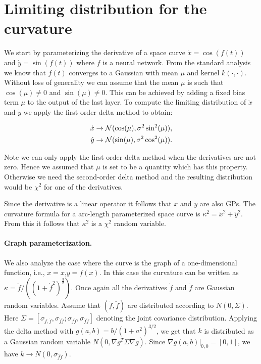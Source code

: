 \section{Limiting distribution for the curvature}

We start by parameterizing the derivative of a space curve $\dot{x} = \cos(f(t))$ 
and $\dot{y} = \sin(f(t))$ where $f$ is a neural network. 
From the standard analysis we know that $f(t)$ converges to a Gaussian with mean $\mu$ and kernel $k(\cdot,\cdot)$. 
Without loss of generality we can assume that the mean $\mu$ is such that $\cos(\mu) \neq 0$ and $\sin(\mu)\neq 0$. 
This can be achieved by adding a fixed bias term $\mu$ to the output of the last layer. 
To compute the limiting distribution of $\ddot{x}$ and $\dot{y}$ we apply the first order delta method to obtain:

\begin{align}
\dot{x} &\rightarrow {\cal N} (\cos(\mu), \sigma^2\sin^2(\mu)), \\
\dot{y} &\rightarrow {\cal N} (\sin(\mu), \sigma^2\cos^2(\mu)). 
\end{align}

Note we can only apply the first order delta method when the derivatives are not zero. 
Hence we assumed that $\mu$ is set to be a quantity which has this property. 
Otherwise we need the second-order delta method and the resulting distribution would be $\chi^2$ for one of the derivatives.

Since the derivative is a linear operator it follows that $\ddot{x}$ and $\ddot{y}$ are also GPs. 
The curvature formula for a arc-length parameterized space curve is $\kappa ^2= \ddot{x}^2 + \ddot{y}^2$. 
From this it follows that $\kappa^2$ is a $\chi^2$ random variable.




\paragraph{Graph parameterization.}

We also analyze the case where the curve is the graph of a one-dimensional function, i.e., $x=x$,$y=f(x)$. 
In this case the curvature can be written as $\kappa=\ddot{f}/((1+\dot{f}^2)^\frac{3}{2})$. 
Once again all the derivatives $\dot{f}$ and $\ddot{f}$ are Gaussian random variables. 
Assume that $(\dot{f}, \ddot{f})$ are distributed according to $N(0,\Sigma)$. Here $\Sigma = [\sigma_{\dot{f},\dot{f}}, \sigma_{\dot{f}\ddot{f}}; \sigma_{\dot{f}\ddot{f}}, \sigma_{\ddot{f}\ddot{f}} ]$ denoting the joint covariance distribution.
Applying the delta method with $g(a, b) = b/(1+a^2)^{3/2}$, we get that $k$ is distributed as a Gaussian random variable $N(0, \nabla g^T \Sigma \nabla g)$. Since $\nabla g(a, b) |_{0,0} = [0, 1]$, we have $k \rightarrow N(0, \sigma_{\ddot{f}\ddot{f}})$.


{\small


}

